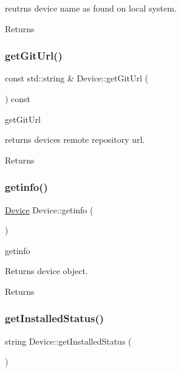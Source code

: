 reutrns device name as found on local system. \begin{DoxyReturn}{Returns}

\end{DoxyReturn}
\mbox{\label{classDevice_a96f94097331f294afc73c6358918d408}} 
\subsubsection{\texorpdfstring{get\+Git\+Url()}{getGitUrl()}}
{\footnotesize\ttfamily const std\+::string \& Device\+::get\+Git\+Url (\begin{DoxyParamCaption}{ }\end{DoxyParamCaption}) const}



get\+Git\+Url 

returns device\textquotesingle{}s remote repository url. \begin{DoxyReturn}{Returns}

\end{DoxyReturn}
\mbox{\label{classDevice_a2036c2bc77979808046f7ecae94ec602}} 
\subsubsection{\texorpdfstring{getinfo()}{getinfo()}}
{\footnotesize\ttfamily \hyperlink{classDevice}{Device} Device\+::getinfo (\begin{DoxyParamCaption}{ }\end{DoxyParamCaption})}



getinfo 

Returns device object. \begin{DoxyReturn}{Returns}

\end{DoxyReturn}
\mbox{\label{classDevice_abdadd7bc6fa1760aeaa9f87dd2f96f59}} 
\subsubsection{\texorpdfstring{get\+Installed\+Status()}{getInstalledStatus()}}
{\footnotesize\ttfamily string Device\+::get\+Installed\+Status (\begin{DoxyParamCaption}{ }\end{DoxyParamCaption})}



